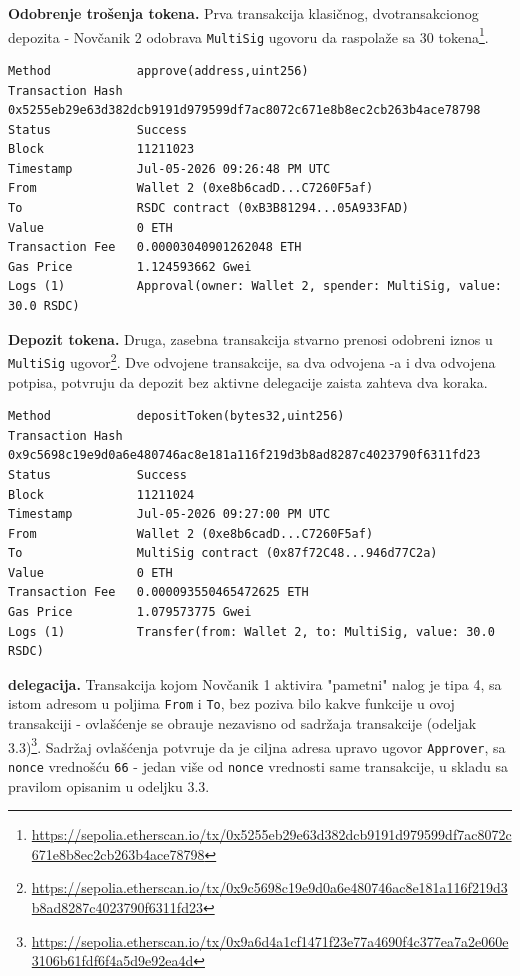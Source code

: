 \newpage

\textbf{Odobrenje tro\v senja tokena.} Prva transakcija klasi\v cnog, dvotransakcionog depozita - Nov\v canik 2 odobrava \texttt{MultiSig} ugovoru da raspola\v ze sa 30  tokena\footnote{\url{https://sepolia.etherscan.io/tx/0x5255eb29e63d382dcb9191d979599df7ac8072c671e8b8ec2cb263b4ace78798}}.

\begin{lstlisting}[caption={Transakcija 1: odobrenje (\texttt{approve}) - klasi\v can depozit}, label={lst:onchain-tx1}]
Method            approve(address,uint256)
Transaction Hash  0x5255eb29e63d382dcb9191d979599df7ac8072c671e8b8ec2cb263b4ace78798
Status            Success
Block             11211023
Timestamp         Jul-05-2026 09:26:48 PM UTC
From              Wallet 2 (0xe8b6cadD...C7260F5af)
To                RSDC contract (0xB3B81294...05A933FAD)
Value             0 ETH
Transaction Fee   0.00003040901262048 ETH
Gas Price         1.124593662 Gwei
Logs (1)          Approval(owner: Wallet 2, spender: MultiSig, value: 30.0 RSDC)
\end{lstlisting}

\textbf{Depozit tokena.} Druga, zasebna transakcija stvarno prenosi odobreni iznos u \texttt{MultiSig} ugovor\footnote{\url{https://sepolia.etherscan.io/tx/0x9c5698c19e9d0a6e480746ac8e181a116f219d3b8ad8287c4023790f6311fd23}}. Dve odvojene transakcije, sa dva odvojena -a i dva odvojena potpisa, potvr\dj uju da depozit bez aktivne delegacije zaista zahteva dva koraka.

\newpage

\begin{lstlisting}[caption={Transakcija 2: depozit (\texttt{depositToken}) - klasi\v can depozit}, label={lst:onchain-tx2}]
Method            depositToken(bytes32,uint256)
Transaction Hash  0x9c5698c19e9d0a6e480746ac8e181a116f219d3b8ad8287c4023790f6311fd23
Status            Success
Block             11211024
Timestamp         Jul-05-2026 09:27:00 PM UTC
From              Wallet 2 (0xe8b6cadD...C7260F5af)
To                MultiSig contract (0x87f72C48...946d77C2a)
Value             0 ETH
Transaction Fee   0.000093550465472625 ETH
Gas Price         1.079573775 Gwei
Logs (1)          Transfer(from: Wallet 2, to: MultiSig, value: 30.0 RSDC)
\end{lstlisting}

\textbf{ delegacija.} Transakcija kojom Nov\v canik 1 aktivira "pametni" nalog je tipa 4, sa istom adresom u poljima \texttt{From} i \texttt{To}, bez poziva bilo kakve funkcije u ovoj transakciji - ovla\v s\' cenje se obra\dj uje nezavisno od sadr\v zaja transakcije (odeljak 3.3)\footnote{\url{https://sepolia.etherscan.io/tx/0x9a6d4a1cf1471f23e77a4690f4c377ea7a2e060e3106b61fdf6f4a5d9e92ea4d}}. Sadr\v zaj ovla\v s\' cenja potvr\dj uje da je ciljna adresa upravo ugovor \texttt{Approver}, sa \texttt{nonce} vredno\v s\' cu \texttt{66} - jedan vi\v se od \texttt{nonce} vrednosti same transakcije, u skladu sa pravilom opisanim u odeljku 3.3.


